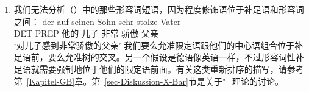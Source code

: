 \begin{enumerate}
\item 我们无法分析（）中的那些形容词短语，因为程度修饰语位于补足语和形容词之间：
\ea
\gll der auf seinen Sohn sehr stolze Vater\\
	 DET PREP 他的 儿子 非常 骄傲 父亲\\
\glt `对儿子感到非常骄傲的父亲'
\z
我们要么允准限定语跟他们的中心语组合位于补足语前，要么允准树的交叉。另一个假设是德语像英语一样，不过形容词性补足语就需要强制地位于他们的限定语前面。有关这类重新排序的描写，请参考第~\ref{Kapitel-GB}章。第~\ref{sec-Diskussion-X-Bar}节是关于\xbar "=理论的讨论。


\end{enumerate}
